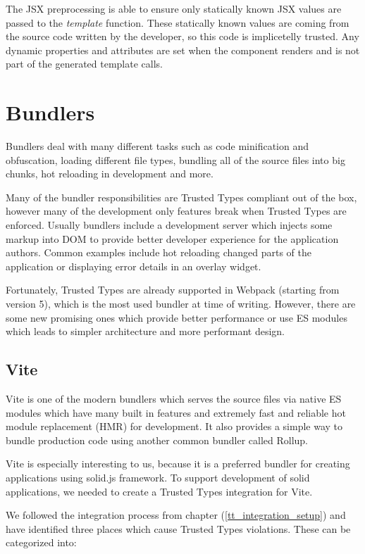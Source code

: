 The JSX preprocessing is able to ensure only statically known JSX values are passed to the
\emph{template} function. These statically known values are coming from the source code written by
the developer, so this code is implicetelly trusted. Any dynamic properties and attributes are set
when the component renders and is not part of the generated template calls.

\section{Bundlers}

Bundlers deal with many different tasks such as code minification and obfuscation, loading different
file types, bundling all of the source files into big chunks, hot reloading in development and more.

Many of the bundler responsibilities are Trusted Types compliant out of the box, however many of the
development only features break when Trusted Types are enforced. Usually bundlers include a
development server which injects some markup into DOM to provide better developer experience for the
application authors. Common examples include hot reloading changed parts of the application or
displaying error details in an overlay widget.

Fortunately, Trusted Types are already supported in Webpack (starting from version 5), which is the
most used bundler at time of writing. However, there are some new promising ones which provide
better performance or use ES modules which leads to simpler architecture and more performant design.

\subsection{Vite}

Vite is one of the modern bundlers which serves the source files via native ES modules which have
many built in features and extremely fast and reliable hot module replacement (HMR) for development.
It also provides a simple way to bundle production code using another common bundler called Rollup.

Vite is especially interesting to us, because it is a preferred bundler for creating applications
using solid.js framework. To support development of solid applications, we needed to create a
Trusted Types integration for Vite.

We followed the integration process from chapter (\ref{tt_integration_setup}) and have identified
three places which cause Trusted Types violations. These can be categorized into:

